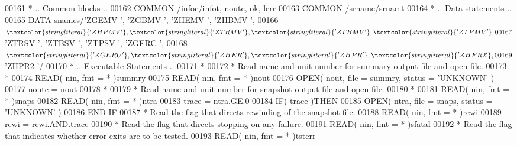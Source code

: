 \begin{DoxyCode}
00161 \textcolor{comment}{*     .. Common blocks ..}
00162       \textcolor{keyword}{COMMON}             /infoc/infot, noutc, ok, lerr
00163       \textcolor{keyword}{COMMON}             /srnamc/srnamt
00164 \textcolor{comment}{*     .. Data statements ..}
00165       \textcolor{keyword}{DATA}               snames/\textcolor{stringliteral}{'ZGEMV '}, \textcolor{stringliteral}{'ZGBMV '}, \textcolor{stringliteral}{'ZHEMV '}, \textcolor{stringliteral}{'ZHBMV '},
00166      $                   \textcolor{stringliteral}{'ZHPMV '}, \textcolor{stringliteral}{'ZTRMV '}, \textcolor{stringliteral}{'ZTBMV '}, \textcolor{stringliteral}{'ZTPMV '},
00167      $                   \textcolor{stringliteral}{'ZTRSV '}, \textcolor{stringliteral}{'ZTBSV '}, \textcolor{stringliteral}{'ZTPSV '}, \textcolor{stringliteral}{'ZGERC '},
00168      $                   \textcolor{stringliteral}{'ZGERU '}, \textcolor{stringliteral}{'ZHER  '}, \textcolor{stringliteral}{'ZHPR  '}, \textcolor{stringliteral}{'ZHER2 '},
00169      $                   \textcolor{stringliteral}{'ZHPR2 '}/
00170 \textcolor{comment}{*     .. Executable Statements ..}
00171 \textcolor{comment}{*}
00172 \textcolor{comment}{*     Read name and unit number for summary output file and open file.}
00173 \textcolor{comment}{*}
00174       \textcolor{keyword}{READ}( nin, fmt = * )summry
00175       \textcolor{keyword}{READ}( nin, fmt = * )nout
00176       \textcolor{keyword}{OPEN}( nout, \hyperlink{structfile}{file} = summry, status = \textcolor{stringliteral}{'UNKNOWN'} )
00177       noutc = nout
00178 \textcolor{comment}{*}
00179 \textcolor{comment}{*     Read name and unit number for snapshot output file and open file.}
00180 \textcolor{comment}{*}
00181       \textcolor{keyword}{READ}( nin, fmt = * )snaps
00182       \textcolor{keyword}{READ}( nin, fmt = * )ntra
00183       trace = ntra.GE.0
00184       \textcolor{keywordflow}{IF}( trace )\textcolor{keywordflow}{THEN}
00185          \textcolor{keyword}{OPEN}( ntra, \hyperlink{structfile}{file} = snaps, status = \textcolor{stringliteral}{'UNKNOWN'} )
00186 \textcolor{keywordflow}{      END IF}
00187 \textcolor{comment}{*     Read the flag that directs rewinding of the snapshot file.}
00188       \textcolor{keyword}{READ}( nin, fmt = * )rewi
00189       rewi = rewi.AND.trace
00190 \textcolor{comment}{*     Read the flag that directs stopping on any failure.}
00191       \textcolor{keyword}{READ}( nin, fmt = * )sfatal
00192 \textcolor{comment}{*     Read the flag that indicates whether error exits are to be tested.}
00193       \textcolor{keyword}{READ}( nin, fmt = * )tsterr

\end{DoxyCode}
